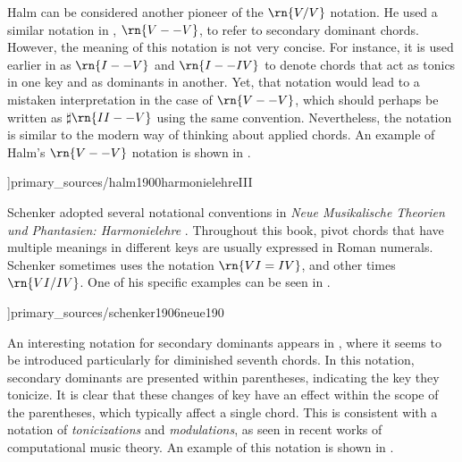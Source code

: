 Halm can be considered another pioneer of the $\rn{V/V}$
notation. He used a similar notation in
\textcite{halm1900harmonielehre}, $\rn{V--V}$, to refer to
secondary dominant chords. However, the meaning of this
notation is not very concise. For instance, it is used
earlier in \textcite[p.~II]{halm1900harmonielehre} as
$\rn{I--V}$ and $\rn{I--IV}$ to denote chords that act as
tonics in one key and as dominants in another. Yet, that
notation would lead to a mistaken interpretation in the case
of $\rn{V--V}$, which should perhaps be written as
$\sharp{}\rn{II--V}$ using the same convention.
Nevertheless, the notation is similar to the modern way of
thinking about applied chords. An example of Halm's
$\rn{V--V}$ notation is shown in
.

\phdfigure[Notation for secondary dominants in
 \textcite[p.~III]{halm1900harmonielehre}]{primary_sources/halm1900harmonielehreIII}

Schenker adopted several notational conventions in
\emph{Neue Musikalische Theorien und Phantasien:
Harmonielehre} \parencite{schenker1906neue}. Throughout this
book, pivot chords that have multiple meanings in different
keys are usually expressed in Roman numerals. Schenker
sometimes uses the notation $\rn{VI=IV}$, and other times
$\rn{VI/IV}$. One of his specific examples can be seen in
.



\phdfigure[Notation for applied chords in
\textcite[p.~190]{schenker1906neue}]{primary_sources/schenker1906neue190}

An interesting notation for secondary dominants appears in
\textcite{white1911harmonic}, where it seems to be
introduced particularly for diminished seventh chords. In
this notation, secondary dominants are presented within
parentheses, indicating the key they tonicize. It is clear
that these changes of key have an effect within the scope of
the parentheses, which typically affect a single chord. This
is consistent with a notation of \emph{tonicizations} and
\emph{modulations}, as seen in recent works of computational
music theory. An example of this notation is shown in
.

